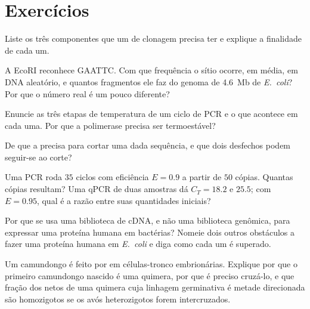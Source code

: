 \section{Exercícios}

\begin{exercise}[$\star$]\label{exo:b3:genetic-engineering:1}
Liste os três componentes que um  de clonagem precisa ter e
explique a finalidade de cada um.
\end{exercise}

\begin{exercise}[$\star$]\label{exo:b3:genetic-engineering:2}
A EcoRI reconhece GAATTC. Com que frequência o sítio ocorre, em média,
em DNA aleatório, e quantos fragmentos ele faz do genoma de
\qty{4.6}{Mb} de \emph{E.~coli}? Por que o número real é um pouco
diferente?
\end{exercise}

\begin{exercise}[$\star$]\label{exo:b3:genetic-engineering:3}
Enuncie as três etapas de temperatura de um ciclo de PCR e o que
acontece em cada uma. Por que a polimerase precisa ser termoestável?
\end{exercise}

\begin{exercise}[$\star$]\label{exo:b3:genetic-engineering:4}
De que a  precisa para cortar uma dada sequência, e que dois
desfechos podem seguir-se ao corte?
\end{exercise}

\begin{exercise}[$\star\star$]\label{exo:b3:genetic-engineering:5}
Uma PCR roda $35$ ciclos com eficiência $E = 0.9$ a partir de $50$
cópias. Quantas cópias resultam? Uma qPCR de duas amostras dá
$C_{T} = 18.2$ e $25.5$; com $E = 0.95$, qual é a razão entre suas
quantidades iniciais?
\end{exercise}

\begin{exercise}[$\star\star$]\label{exo:b3:genetic-engineering:6}
Por que se usa uma biblioteca de cDNA, e não uma biblioteca genômica,
para expressar uma proteína humana em bactérias? Nomeie dois outros
obstáculos a fazer uma proteína humana em \emph{E.~coli} e diga como
cada um é superado.
\end{exercise}

\begin{exercise}[$\star\star$]\label{exo:b3:genetic-engineering:7}
Um camundongo  é feito por  em
células-tronco embrionárias. Explique por que o primeiro camundongo
nascido é uma quimera, por que é preciso cruzá-lo, e que fração dos
netos de uma quimera cuja linhagem germinativa é metade direcionada são
 homozigotos se os avós heterozigotos forem intercruzados.
\end{exercise}

